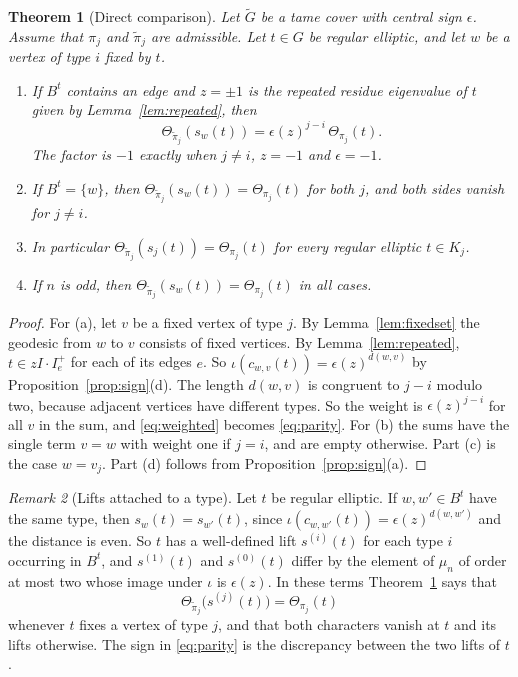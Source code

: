 \documentclass[12pt,letterpaper]{article}
\numberwithin{equation}{section}
\newtheorem{theorem}{Theorem}[section]
\theoremstyle{definition}
\theoremstyle{remark}
\newtheorem{remark}[theorem]{Remark}
\newcommand{\Gt}{\widetilde G}
\newcommand{\sgn}{\epsilon}
\begin{document}
\begin{theorem}[Direct comparison]\label{thm:compare}
Let $\Gt$ be a tame cover with central sign $\sgn$. Assume that $\pi_j$ and $\widetilde\pi_j$ are admissible. Let $t\in G$ be regular elliptic, and let $w$ be a vertex of type $i$ fixed by $t$.
\begin{enumerate}[label=(\alph*),leftmargin=2.2em]
\item If $B^t$ contains an edge and $z=\pm1$ is the repeated residue eigenvalue of $t$ given by Lemma~\ref{lem:repeated}, then
\begin{equation}\label{eq:parity}
 \Theta_{\widetilde\pi_j}(s_w(t))
 =\sgn(z)^{j-i}\,\Theta_{\pi_j}(t).
\end{equation}
The factor is $-1$ exactly when $j\ne i$, $z=-1$ and $\sgn=-1$.
\item If $B^t=\{w\}$, then $\Theta_{\widetilde\pi_j}(s_w(t))=\Theta_{\pi_j}(t)$ for both $j$, and both sides vanish for $j\ne i$.
\item In particular $\Theta_{\widetilde\pi_j}(s_j(t))=\Theta_{\pi_j}(t)$ for every regular elliptic $t\in K_j$.
\item If $n$ is odd, then $\Theta_{\widetilde\pi_j}(s_w(t))=\Theta_{\pi_j}(t)$ in all cases.
\end{enumerate}
\end{theorem}
\begin{proof}
For (a), let $v$ be a fixed vertex of type $j$. By Lemma~\ref{lem:fixedset} the geodesic from $w$ to $v$ consists of fixed vertices. By Lemma~\ref{lem:repeated}, $t\in zI\cdot I_e^+$ for each of its edges $e$. So $\iota(c_{w,v}(t))=\sgn(z)^{d(w,v)}$ by Proposition~\ref{prop:sign}(d). The length $d(w,v)$ is congruent to $j-i$ modulo two, because adjacent vertices have different types. So the weight is $\sgn(z)^{j-i}$ for all $v$ in the sum, and \eqref{eq:weighted} becomes \eqref{eq:parity}. For (b) the sums have the single term $v=w$ with weight one if $j=i$, and are empty otherwise. Part (c) is the case $w=v_j$. Part (d) follows from Proposition~\ref{prop:sign}(a).
\end{proof}

\begin{remark}[Lifts attached to a type]\label{rem:lifts}
Let $t$ be regular elliptic. If $w,w'\in B^t$ have the same type, then $s_w(t)=s_{w'}(t)$, since $\iota(c_{w,w'}(t))=\sgn(z)^{d(w,w')}$ and the distance is even. So $t$ has a well-defined lift $s^{(i)}(t)$ for each type $i$ occurring in $B^t$, and $s^{(1)}(t)$ and $s^{(0)}(t)$ differ by the element of $\mu_n$ of order at most two whose image under $\iota$ is $\sgn(z)$. In these terms Theorem~\ref{thm:compare} says that
\[
 \Theta_{\widetilde\pi_j}\bigl(s^{(j)}(t)\bigr)=\Theta_{\pi_j}(t)
\]
whenever $t$ fixes a vertex of type $j$, and that both characters vanish at $t$ and its lifts otherwise. The sign in \eqref{eq:parity} is the discrepancy between the two lifts of $t$.
\end{remark}
\end{document}

